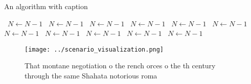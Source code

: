 \documentclass[a4paper]{article}
\begin{document}
\begin{algorithm}
\caption{An algorithm with caption}
\begin{algorithmic}
\    \State $N \gets N - 1$
\    \State $N \gets N - 1$
\    \State $N \gets N - 1$
\    \State $N \gets N - 1$
\    \State $N \gets N - 1$
\    \State $N \gets N - 1$
\    \State $N \gets N - 1$
\    \State $N \gets N - 1$
\    \State $N \gets N - 1$
\    \State $N \gets N - 1$
\    \State $N \gets N - 1$
\EndWhile
\end{algorithmic}
\end{algorithm}

\begin{figure}
\centering
\texttt{[image: ../scenario\_visualization.png]}
\caption{That montane negotiation o the rench orces o the th century through the same Shahata notorious roma
}
\end{figure}
 
\end{document}

